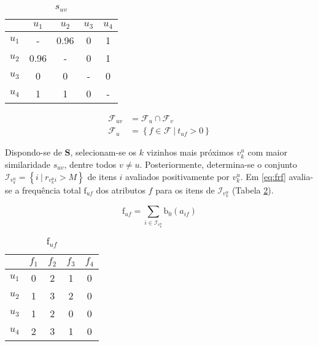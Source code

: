 \begin{table}[p]
\begin{center}
    \caption{$s_{uv}$}
    \label{tab:s_uv}
    \begin{tabular}{ | c | c | c | c | c | } 
    \hline
     & $u_1$ & $u_2$ & $u_3$ & $u_4$   \\ \hline
     $u_1$ & - & 0.96 & 0 & 1  \\ \hline
     $u_2$ & 0.96 & - & 0 & 1  \\ \hline
     $u_3$ & 0 & 0 & - & 0  \\ \hline
     $u_4$ & 1 & 1 & 0 & -  \\ \hline
    \end{tabular}
\end{center}
\end{table}

\begin{equation}
\label{eq:fuv}
\begin{split}
    \mathcal{F}_{uv} &= \mathcal{F}_u \cap \mathcal{F}_v \\
    \mathcal{F}_u &= \left\{ f \in \mathcal{F}~|~t_{uf} > 0 \right\}
\end{split}    
\end{equation} 

Dispondo-se de $\mathbf{S}$, selecionam-se os $k$ vizinhos mais próximos $v_k^u$ com maior similaridade $s_{uv}$, dentre todos $v \neq u$.  Posteriormente, determina-se o conjunto $\mathcal{I}_{v_k^u} = \left\{ i ~|~ r_{v_k^u i} > M\right\}$ de itens $i$ avaliados positivamente por $v_k^u$. Em \ref{eq:frf} avalia-se a frequência total $\mathrm{f}_{uf}$ dos atributos $f$ para os itens de $\mathcal{I}_{v_k^u}$ (Tabela \ref{tab:f_uf}). 

\begin{equation}
\label{eq:frf} 
\mathrm{f}_{uf} = \sum_{i \in \mathcal{I}_{v_k^u}}{\mathrm{b}_0\left(a_{if}\right)}
\end{equation} 

\begin{table}[p]
\begin{center}
    \caption{$\mathrm{f}_{uf}$}
    \label{tab:f_uf}
    \begin{tabular}{ | c | c | c | c | c | } 
    \hline
     & $f_1$ & $f_2$ & $f_3$ & $f_4$   \\ \hline
     $u_1$ & 0 & 2 & 1 & 0  \\ \hline
     $u_2$ & 1 & 3 & 2 & 0  \\ \hline
     $u_3$ & 1 & 2 & 0 & 0  \\ \hline
     $u_4$ & 2 & 3 & 1 & 0  \\ \hline
    \end{tabular}
\end{center}
\end{table}

